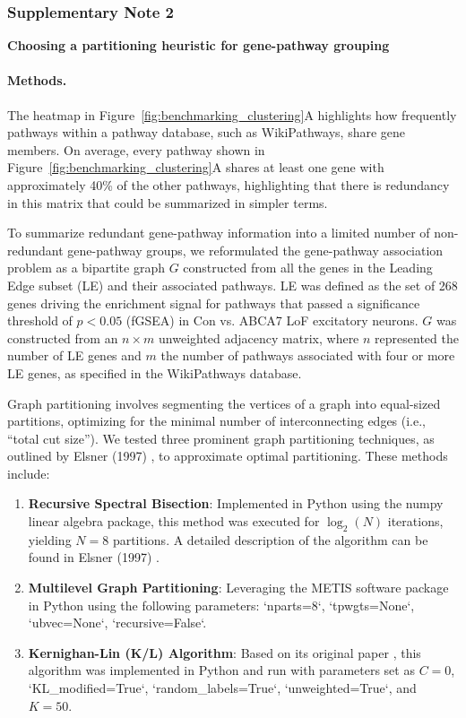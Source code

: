 \subsubsection*{Supplementary Note 2}
\textbf{Choosing a partitioning heuristic for gene-pathway grouping}
\paragraph{Methods.}
The heatmap in Figure~\ref{fig:benchmarking_clustering}A highlights how frequently pathways within a pathway database, such as WikiPathways, share gene members. On average, every pathway shown in Figure~\ref{fig:benchmarking_clustering}A shares at least one gene with approximately 40\% of the other pathways, highlighting that there is redundancy in this matrix that could be summarized in simpler terms.

To summarize redundant gene-pathway information into a limited number of non-redundant gene-pathway groups, we reformulated the gene-pathway association problem as a bipartite graph $G$ constructed from all the genes in the Leading Edge subset (LE) and their associated pathways. LE was defined as the set of 268 genes driving the enrichment signal for pathways that passed a significance threshold of $p < 0.05$ (fGSEA) in Con vs. ABCA7 LoF excitatory neurons. $G$ was constructed from an $n \times m$ unweighted adjacency matrix, where $n$ represented the number of LE genes and $m$ the number of pathways associated with four or more LE genes, as specified in the WikiPathways database.

Graph partitioning involves segmenting the vertices of a graph into equal-sized partitions, optimizing for the minimal number of interconnecting edges (i.e., “total cut size”). We tested three prominent graph partitioning techniques, as outlined by Elsner (1997) \supercite{Elsner1997GraphPartitioning}, to approximate optimal partitioning. These methods include:

\begin{enumerate}
    \item \textbf{Recursive Spectral Bisection}: Implemented in Python using the numpy linear algebra package, this method was executed for $\log_2(N)$ iterations, yielding $N = 8$ partitions. A detailed description of the algorithm can be found in Elsner (1997) \supercite{Elsner1997GraphPartitioning}.
    \item \textbf{Multilevel Graph Partitioning}: Leveraging the METIS software package \supercite{Karypis1997METIS} in Python using the following parameters: `nparts=8`, `tpwgts=None`, `ubvec=None`, `recursive=False`.
    \item \textbf{Kernighan-Lin (K/L) Algorithm}: Based on its original paper \supercite{Kernighan1970-zl}, this algorithm was implemented in Python and run with parameters set as $C=0$, `KL\_modified=True`, `random\_labels=True`, `unweighted=True`, and $K=50$.
\end{enumerate}

